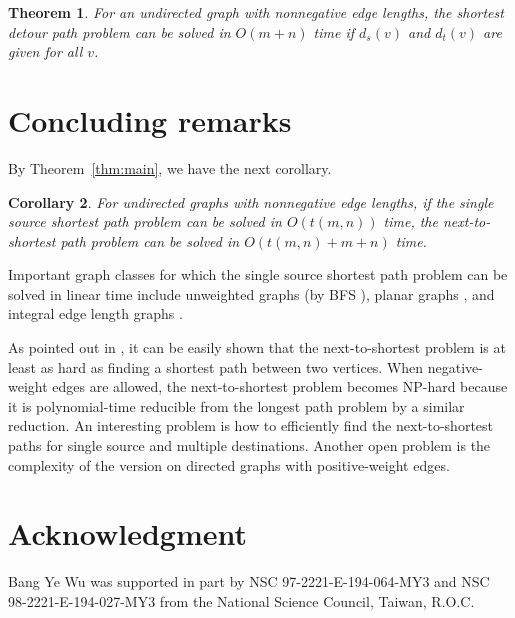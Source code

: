 \documentclass[review]{elsarticle}
\def\squarebox#1{\hbox to #1{\hfill\vbox to #1{\vfill}}}
\renewcommand{\qed}{\hspace*{\fill}
            \vbox{\hrule\hbox{\vrule\squarebox{.667em}\vrule}\hrule}\smallskip\newline}
\newtheorem{thm}{Theorem}
\newtheorem{cor}[thm]{Corollary}
\begin{document}
\begin{thm}\label{thm:out}
For an undirected graph with nonnegative edge lengths, the shortest
detour path problem can be solved in $O(m+n)$ time if $d_s(v)$ and
$d_t(v)$ are given for all $v$.
\end{thm}

\section{Concluding remarks}
By Theorem~\ref{thm:main}, we have the next corollary.
\begin{cor}
For undirected graphs with nonnegative edge lengths, if the single
source shortest path problem can be solved in $O(t(m,n))$ time, the
next-to-shortest path problem can be solved in $O(t(m,n)+m+n)$ time.
\end{cor}
Important graph classes for which the single source shortest path
problem can be solved in linear time include unweighted graphs (by
BFS \cite{cor01}), planar graphs \cite{hen97}, and integral edge
length graphs \cite{thr99}.

As pointed out in \cite{li06,wu10}, it can be easily shown that the next-to-shortest problem is at least as hard as finding a shortest path between two vertices. When negative-weight edges are allowed, the next-to-shortest problem becomes NP-hard because it is polynomial-time reducible from the longest path problem by a similar reduction. 
An interesting problem is how to efficiently find the next-to-shortest paths for single source and multiple destinations. Another open problem is the complexity of the version on directed graphs with positive-weight edges.

\section*{Acknowledgment}
Bang Ye Wu was supported in part by NSC 97-2221-E-194-064-MY3 and
NSC 98-2221-E-194-027-MY3 from the National Science Council, Taiwan,
R.O.C.
\end{document}
